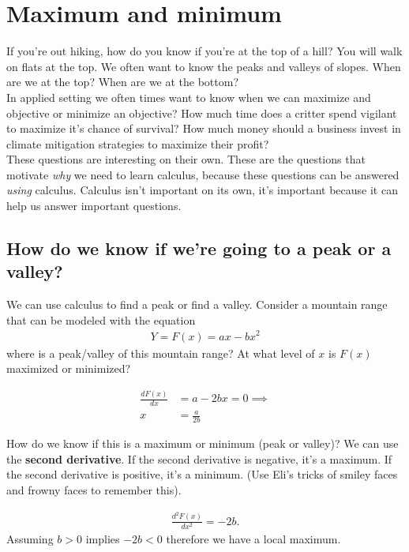 \documentclass{article}
\begin{document}
\section{Maximum and minimum}
If you're out hiking, how do you know if you're at the top of a hill? You will walk on flats at the top. We often want to know the peaks and valleys of slopes. When are we at the top? When are we at the bottom? \\

In applied setting we often times want to know when we can maximize and objective or minimize an objective? How much time does a critter spend vigilant to maximize it's chance of survival? How much money should a business invest in climate mitigation strategies to maximize their profit? \\

These questions are interesting on their own. These are the questions that motivate \textit{why} we need to learn calculus, because these questions can be answered \textit{using} calculus. Calculus isn't important on its own, it's important because it can help us answer important questions. 

\subsection{How do we know if we're going to a peak or a valley?}
We can use calculus to find a peak or find a valley. Consider a mountain range that can be modeled with the equation
\begin{align}
    Y = F(x) = ax - bx^2
\end{align}
where is a peak/valley of this mountain range? At what level of $x$ is $F(x)$ maximized or minimized?

\begin{align}
    \frac{dF(x)}{dx} &= a - 2bx = 0 \implies \\
    x &= \frac{a}{2b}
\end{align}

How do we know if this is a maximum or minimum (peak or valley)? We can use the \textbf{second derivative}. If the second derivative is negative, it's a maximum. If the second derivative is positive, it's a minimum. (Use Eli's tricks of smiley faces and frowny faces to remember this). 

\begin{align}
    \frac{d^2F(x)}{dx^2} = -2b.
\end{align}
Assuming $b>0$ implies $-2b<0$ therefore we have a local maximum. \\
\end{document}
